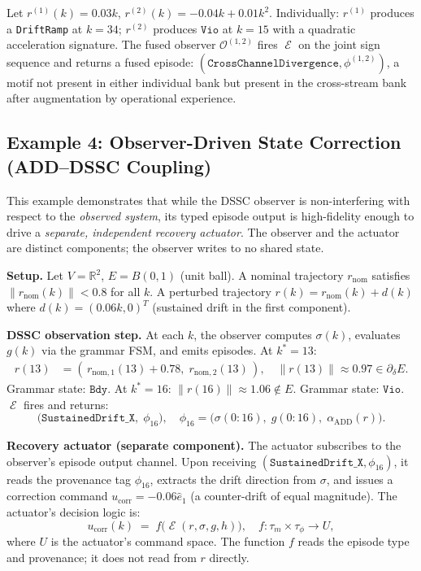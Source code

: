 \documentclass[11pt,a4paper]{article}
\theoremstyle{plain}
\theoremstyle{definition}
\theoremstyle{remark}
\DeclareMathOperator{\Endo}{\mathcal{E}}
\newcommand{\R}{\mathbb{R}}
\newcommand{\Obs}{\mathcal{O}}
\newcommand{\norm}[1]{\left\|#1\right\|}
\begin{document}
Let $r^{(1)}(k) = 0.03k$, $r^{(2)}(k) = -0.04k + 0.01k^2$. Individually:
$r^{(1)}$ produces a \texttt{DriftRamp} at $k = 34$; $r^{(2)}$ produces
$\mathtt{Vio}$ at $k = 15$ with a quadratic acceleration signature. The fused observer
$\Obs^{(1,2)}$ fires $\Endo$ on the joint sign sequence and returns a fused episode:
$(\texttt{CrossChannelDivergence}, \phi^{(1,2)})$, a motif not present in either individual
bank but present in the cross-stream bank after augmentation by operational experience.

\subsection*{Example 4: Observer-Driven State Correction (ADD--DSSC Coupling)}

This example demonstrates that while the DSSC observer is non-interfering with respect to
the \emph{observed system}, its typed episode output is high-fidelity enough to drive a
\emph{separate, independent recovery actuator}. The observer and the actuator are distinct
components; the observer writes to no shared state.

\textbf{Setup.} Let $V = \R^2$, $E = B(0, 1)$ (unit ball). A nominal trajectory $r_{\text{nom}}$
satisfies $\norm{r_{\text{nom}}(k)} < 0.8$ for all $k$. A perturbed trajectory
$r(k) = r_{\text{nom}}(k) + d(k)$ where $d(k) = (0.06k, 0)^T$ (sustained drift in the first
component).

\textbf{DSSC observation step.} At each $k$, the observer computes $\sigma(k)$, evaluates
$g(k)$ via the grammar FSM, and emits episodes. At $k^* = 13$:
\begin{align*}
  r(13) &= (\,r_{\text{nom},1}(13) + 0.78,\; r_{\text{nom},2}(13)\,), \quad \norm{r(13)} \approx 0.97 \in \partial_\delta E.
\end{align*}
Grammar state: $\mathtt{Bdy}$. At $k^* = 16$: $\norm{r(16)} \approx 1.06 \notin E$.
Grammar state: $\mathtt{Vio}$. $\Endo$ fires and returns:
\[
  \bigl(\texttt{SustainedDrift\_X},\; \phi_{16}\bigr), \quad
  \phi_{16} = \bigl(\sigma(0{:}16),\; g(0{:}16),\; \alpha_{\text{ADD}}(r)\bigr).
\]

\textbf{Recovery actuator (separate component).} The actuator subscribes to the observer's
episode output channel. Upon receiving
$(\texttt{SustainedDrift\_X}, \phi_{16})$, it reads the provenance tag $\phi_{16}$,
extracts the drift direction from $\sigma$, and issues a correction command
$u_{\text{corr}} = -0.06 \hat{e}_1$ (a counter-drift of equal magnitude). The actuator's
decision logic is:
\begin{equation}
  u_{\text{corr}}(k) \;=\; f\bigl(\Endo(r, \sigma, g, h)\bigr), \quad
  f : \tau_m \times \tau_\phi \to U,
\end{equation}
where $U$ is the actuator's command space. The function $f$ reads the episode type and
provenance; it does not read from $r$ directly.
\end{document}
